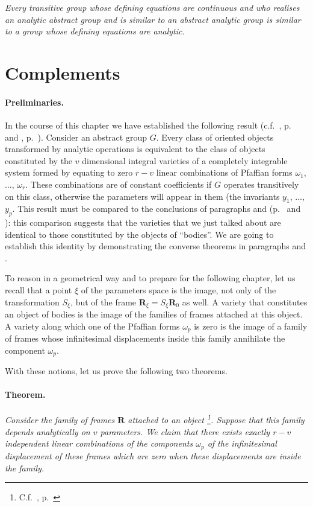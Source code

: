 \somespace

\emph{Every transitive group whose defining equations are continuous and who realises an analytic abstract group and is similar to an abstract analytic group is similar to a group whose defining equations are analytic.}


\section{Complements}
\label{sec:complements}

\paragraph{Preliminaries.}
\label{sec:122}
In the course of this chapter we have established the following result (c.f.~, p.~\pageref{sec:116} and , p.~\pageref{sec:119}). Consider an abstract group $G$. Every class of oriented objects transformed by analytic operations is equivalent to the class of objects constituted by the $v$ dimensional integral varieties of a completely integrable system formed by equating to zero $r-v$ linear combinations of Pfaffian forms $\omega_{1}$, $\dots$, $\omega_{r}$. These combinations are of constant coefficients if $G$ operates transitively on this class, otherwise the parameters will appear in them (the invariants $y_{1}$, $\dots$, $y_{p}$. This result must be compared to the conclusions of paragraphs  and  (p.~\pageref{sec:95} and \pageref{sec:96}): this comparison suggests that the varieties that we just talked about are identical to those constituted by the objects of ``bodies''. We are going to establish this identity by demonstrating the converse theorems in paragraphs  and .

To reason in a geometrical way and to prepare for the following chapter, let us recall that a point $\xi$ of the parameters space is the image, not only of the transformation $S_{\xi}$, but of the frame $\mathbf{R}_{\xi}=S_{\xi}\mathbf{R}_{0}$ as well. A variety that constitutes an object of bodies is the image of the families of frames attached at this object. A variety along which one of the Pfaffian forms $\omega_{p}$ is zero is the image of a family of frames whose infinitesimal displacements inside this family annihilate the component $\omega_{p}$.

With these notions, let us prove the following two theorems.


\paragraph{Theorem.}
\label{sec:123}
\emph{Consider the family of frames $\mathbf{R}$ attached to an object \footnote{C.f.~, p.~\pageref{sec:93}}. Suppose that this family depends analytically on $v$ parameters. We claim that there exists exactly $r-v$ independent linear combinations of the components $\omega_{p}$ of the infinitesimal displacement of these frames which are zero when these displacements are inside the family.}

